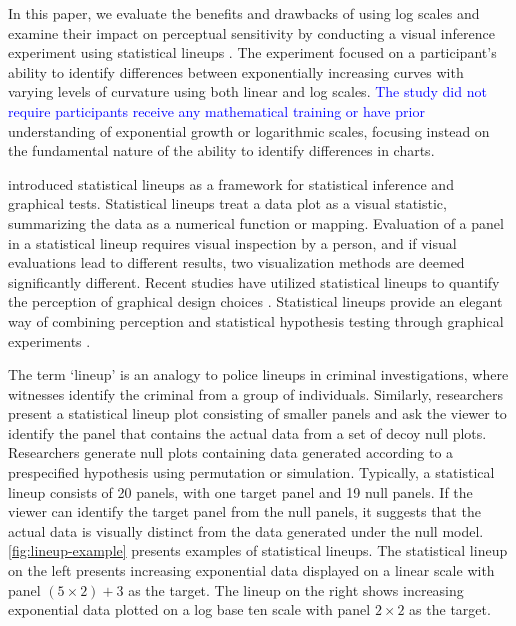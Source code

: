 \documentclass[12pt]{article}
\begin{document}
In this paper, we evaluate the benefits and drawbacks of using log
scales and examine their impact on perceptual sensitivity by conducting
a visual inference experiment using statistical lineups
\citep{buja_statistical_2009}. The experiment focused on a participant's
ability to identify differences between exponentially increasing curves
with varying levels of curvature using both linear and log scales.
{\textcolor{blue}{The study did not require participants receive any mathematical training or have prior}}
understanding of exponential growth or logarithmic scales, focusing
instead on the fundamental nature of the ability to identify differences
in charts.

\citet{buja_statistical_2009} introduced statistical lineups as a
framework for statistical inference and graphical tests. Statistical
lineups treat a data plot as a visual statistic, summarizing the data as
a numerical function or mapping. Evaluation of a panel in a statistical
lineup requires visual inspection by a person, and if visual evaluations
lead to different results, two visualization methods are deemed
significantly different. Recent studies have utilized statistical
lineups to quantify the perception of graphical design choices
\citep{hofmann_graphical_2012, loy_model_2017, loy_variations_2016, vanderplas_clusters_2017}.
Statistical lineups provide an elegant way of combining perception and
statistical hypothesis testing through graphical experiments
\citep{majumder_validation_2013, vanderplas_testing_2020, wickham2010graphical}.

The term `lineup' is an analogy to police lineups in criminal
investigations, where witnesses identify the criminal from a group of
individuals. Similarly, researchers present a statistical lineup plot
consisting of smaller panels and ask the viewer to identify the panel
that contains the actual data from a set of decoy null plots.
Researchers generate null plots
{\textcolor{RedOrange}{containing data generated according to a prespecified hypothesis using permutation or simulation}}.
Typically, a statistical lineup consists of 20 panels, with one target
panel and 19 null panels. If the viewer can identify the target panel
from the null panels, it suggests that the actual data is visually
distinct from the data generated under the null model.
\cref{fig:lineup-example} presents examples of statistical lineups. The
statistical lineup on the left presents increasing exponential data
displayed on a linear scale with panel \((5 \times 2) + 3\) as the
target. The lineup on the right shows increasing exponential data
plotted on a log base ten scale with panel \(2 \times 2\) as the target.
\end{document}

